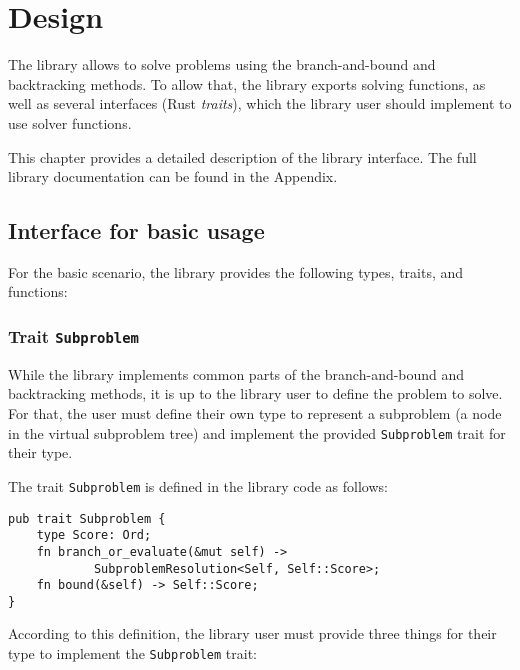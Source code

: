 \chapter{Design}
\label{chap:design}

The library allows to solve problems using the branch-and-bound and backtracking methods.
To allow that, the library exports solving functions, as well as several interfaces
(Rust \emph{traits}), which the library user should implement to use solver functions.

This chapter provides a detailed description of the library interface. The full library
documentation can be found in the Appendix.

\section{Interface for basic usage}

\label{sec:basic_usage}

For the basic scenario, the library provides the following types, traits, and functions:

\subsection{Trait \texttt{Subproblem}}

While the library implements common parts of the branch-and-bound and backtracking methods,
it is up to the library user to define the problem to solve. For that, the user must define
their own type to represent a subproblem (a node in the virtual subproblem tree) and implement
the provided \texttt{Subproblem} trait for their type.

The trait \texttt{Subproblem} is defined in the library code as follows:

\begin{lstlisting}[caption=Trait \texttt{Subproblem}]
pub trait Subproblem {
    type Score: Ord;
    fn branch_or_evaluate(&mut self) ->
            SubproblemResolution<Self, Self::Score>;
    fn bound(&self) -> Self::Score;
}
\end{lstlisting}

According to this definition, the library user must provide three things for their type to
implement the \texttt{Subproblem} trait:

